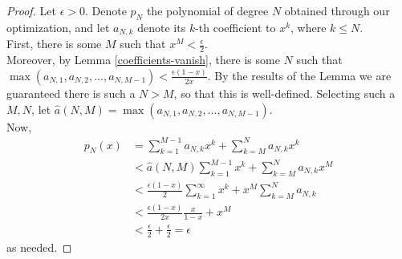 \documentclass[11pt]{article}
\theoremstyle{definition}
\theoremstyle{remark}
\numberwithin{equation}{section}
\begin{document}
\begin{proof}
Let $\epsilon > 0$. Denote $p_N$ the polynomial of degree $N$ obtained through our optimization, and let $a_{N,k}$ denote its $k$-th coefficient to $x^k$, where $k \le N$.\\
First, there is some $M$ such that $x^M < \frac{\epsilon}{2}$. \\
Moreover, by Lemma \ref{coefficients-vanish}, there is some $N$ such that $\max (a_{N,1}, a_{N,2},..., a_{N,M-1}) < \frac{\epsilon(1-x)}{2x}$. By the results of the Lemma we are guaranteed there is such a $N>M$, so that this is well-defined. Selecting such a $M, N$, let $\hat{a}(N,M) = \max (a_{N,1}, a_{N,2},..., a_{N,M-1}) $.\\
Now,
\begin{align*}
p_N(x) &= \sum_{k=1}^{M-1} a_{N,k} x^k + \sum_{k=M}^N a_{N,k}x ^k\\
&< \hat{a}(N,M) \sum_{k=1}^{M-1} x^ k + \sum_{k=M}^N a_{N,k} x^M \\
&< \frac{\epsilon(1-x)}{2} \sum_{k=1}^\infty x^k + x^M \sum_{k=M}^N a_{N,k}\\
& < \frac{\epsilon(1-x)}{2x} \frac{x}{1-x} + x^M \\
&< \frac{\epsilon}{2} + \frac{\epsilon}{2} = \epsilon
\end{align*}
as needed.
\end{proof}
\end{document}
